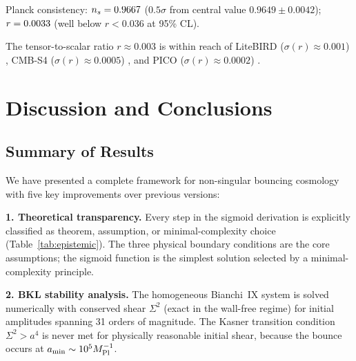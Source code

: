 \documentclass[11pt,a4paper]{article}
\begin{document}
Planck consistency: $n_s = 0.9667$ ($0.5\sigma$ from central value $0.9649 \pm 0.0042$); $r = 0.0033$ (well below $r < 0.036$ at 95\% CL).

The tensor-to-scalar ratio $r \approx 0.003$ is within reach of LiteBIRD ($\sigma(r) \approx 0.001$) \cite{LiteBIRD2022}, CMB-S4 ($\sigma(r) \approx 0.0005$) \cite{CMB-S42016}, and PICO ($\sigma(r) \approx 0.0002$) \cite{PICO2019}.

\section{Discussion and Conclusions}
\label{sec:conclusions}

\subsection{Summary of Results}

We have presented a complete framework for non-singular bouncing cosmology with five key improvements over previous versions:

\textbf{1. Theoretical transparency.} Every step in the sigmoid derivation is explicitly classified as theorem, assumption, or minimal-complexity choice (Table~\ref{tab:epistemic}). The three physical boundary conditions are the core assumptions; the sigmoid function is the simplest solution selected by a minimal-complexity principle.

\textbf{2. BKL stability analysis.} The homogeneous Bianchi~IX system is solved numerically with conserved shear $\Sigma^2$ (exact in the wall-free regime) for initial amplitudes spanning 31 orders of magnitude. The Kasner transition condition $\Sigma^2 > a^4$ is never met for physically reasonable initial shear, because the bounce occurs at $a_{\rm min} \sim 10^5 M_{\rm Pl}^{-1}$.
\end{document}
